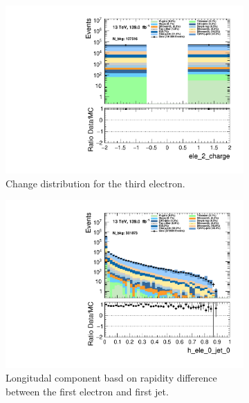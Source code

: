 \begin{figure}
\begin{subfigure}{.49\textwidth}
        \includegraphics[width=\textwidth]{Figures/MC_Data_comp/ele_2_charge.pdf}
        \caption{Change distribution for the third electron. }
        \label{fig:ele_2_charge}
    \end{subfigure}
    \hfill
    \begin{subfigure}{.49\textwidth}
        \includegraphics[width=\textwidth]{Figures/MC_Data_comp/h_ele_0_jet_0.pdf}
        \caption{ Longitudal component basd on rapidity difference between the first electron and first jet.}
        \label{fig:h_ele_0_jet_0}
    \end{subfigure}
    \hfill       
    \caption{}
    \label{fig:batch3_feats}
\end{figure}

